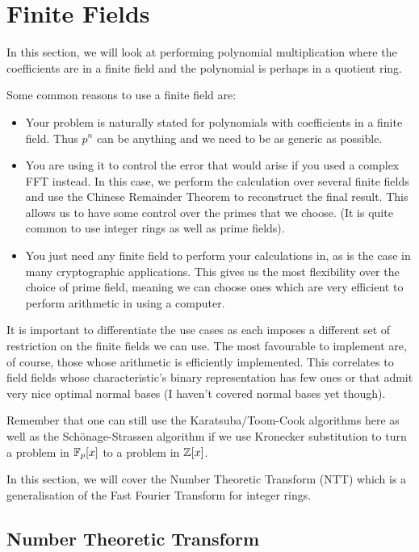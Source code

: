 \chapter{Finite Fields}\label{chp:finite}

In this section, we will look at performing polynomial multiplication where the coefficients are in a finite field and the polynomial is perhaps in a quotient ring.

Some common reasons to use a finite field are:
\begin{itemize}
\item Your problem is naturally stated for polynomials with coefficients
in a finite field. Thus $p^n$ can be anything and we need to be as generic as possible.
\item You are using it to control the error that would arise if you used a complex FFT instead. In this case, we perform the calculation over several finite fields and use the Chinese Remainder Theorem to reconstruct the final result. This allows us to have some control over the primes that we choose. (It is quite common to use integer rings as well as prime fields).
\item You just need any finite field to perform your calculations in, as is the case in many cryptographic applications. This gives us the most flexibility over the choice of prime field, meaning we can choose ones which are very efficient to perform arithmetic in using a computer.
\end{itemize}

It is important to differentiate the use cases as each imposes a different set of restriction on the finite fields we can use. The most favourable to implement are, of course, those whose arithmetic is efficiently implemented. This correlates to field fields whose characteristic's binary representation has few ones or that admit very nice optimal normal bases (I haven't covered normal bases yet though).

Remember that one can still use the Karatsuba/Toom-Cook algorithms here as well as the Sch\"{o}nage-Strassen algorithm if we use Kronecker substitution to turn a problem in $\mathbb{F}_p[x]$ to a problem in ${\mathbb Z}[x]$.

In this section, we will cover the Number Theoretic Transform (NTT) which is a generalisation of the Fast Fourier Transform for integer rings. 

\section{Number Theoretic Transform}
\label{sec:ntt}

